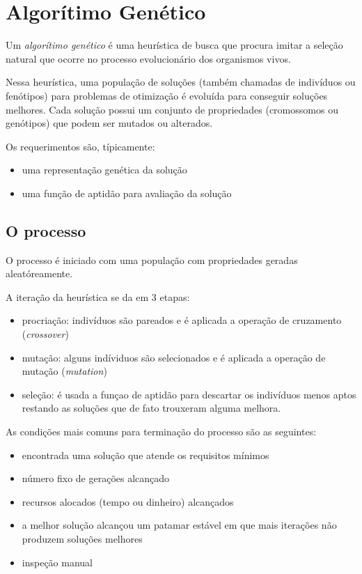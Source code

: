 \section{Algorítimo Genético}

Um \emph{algorítimo genético} é uma heurística de busca que procura
imitar a seleção natural que ocorre no processo evolucionário dos
organismos vivos.

Nessa heurística, uma população de soluções (também chamadas de
indivíduos ou fenótipos) para problemas de otimização é evoluída para
conseguir soluções melhores. Cada solução possui um conjunto de
propriedades (cromossomos ou genótipos) que podem ser mutados ou
alterados.

Os requerimentos são, típicamente:

\begin{itemize}
\itemsep1pt\parskip0pt
\item
  uma representação genética da solução
\item
  uma função de aptidão para avaliação da solução
\end{itemize}

\subsection{O processo}

O processo é iniciado com uma população com propriedades geradas
aleatóreamente.

A iteração da heurística se da em 3 etapas:

\begin{itemize}
\itemsep1pt\parskip0pt
\item
  procriação: indivíduos são pareados e é aplicada a operação de
  cruzamento (\emph{crossover})
\item
  mutação: alguns indíviduos são selecionados e é aplicada a operação de
  mutação (\emph{mutation})
\item
  seleção: é usada a funçao de aptidão para descartar os indivíduos
  menos aptos restando as soluções que de fato trouxeram alguma melhora.
\end{itemize}

As condições mais comuns para terminação do processo são as seguintes:

\begin{itemize}
\itemsep1pt\parskip0pt
\item
  encontrada uma solução que atende os requisitos mínimos
\item
  número fixo de gerações alcançado
\item
  recursos alocados (tempo ou dinheiro) alcançados
\item
  a melhor solução alcançou um patamar estável em que mais iterações não
  produzem soluções melhores
\item
  inspeção manual
\end{itemize}

